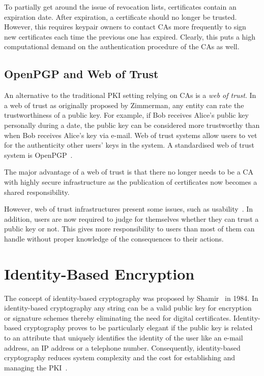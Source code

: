 To partially get around the issue of revocation lists, certificates contain an expiration date. After expiration, a certificate should no longer be trusted. However, this requires keypair owners to contact CAs more frequently to sign new certificates each time the previous one has expired. Clearly, this puts a high computational demand on the authentication procedure of the CAs as well.

\subsection{OpenPGP and Web of Trust}
\label{sec:web_of_trust}
An alternative to the traditional PKI setting relying on CAs is a \textit{web of trust}. In a web of trust as originally proposed by Zimmerman, any entity can rate the trustworthiness of a public key. For example, if Bob receives Alice's public key personally during a date, the public key can be considered more trustworthy than when Bob receives Alice's key via e-mail. Web of trust systems allow users to vet for the authenticity other users' keys in the system. A standardised web of trust system is OpenPGP~\cite{rfc4880}.

The major advantage of a web of trust is that there no longer needs to be a CA with highly secure infrastructure as the publication of certificates now becomes a shared responsibility.

However, web of trust infrastructures present some issues, such as usability~\cite{art:WhittenT99}. In addition, users are now required to judge for themselves whether they can trust a public key or not. This gives more responsibility to users than most of them can handle without proper knowledge of the consequences to their actions.

\section{Identity-Based Encryption}
The concept of identity-based cryptography was proposed by Shamir~\cite{art:Shamir84} in 1984. In identity-based cryptography any string can be a valid public key for encryption or signature schemes thereby eliminating the need for digital certificates. Identity-based cryptography proves to be particularly elegant if the public key is related to an attribute that uniquely identifies the identity of the user like an e-mail address, an IP address or a telephone number. Consequently, identity-based cryptography reduces system complexity and the cost for establishing and managing the PKI~\cite{art:BaekNSS04}. 


